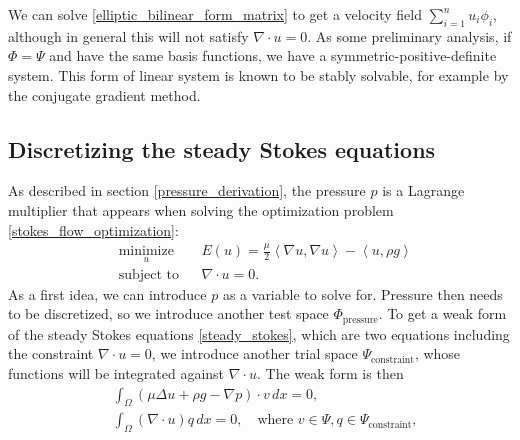 \documentclass[11pt,a4paper]{memoir}
\newcommand{\inner}[1]{\left<#1\right>}
\newcommand{\om}{{\Omega}}
\begin{document}
We can solve \eqref{elliptic_bilinear_form_matrix} to get a velocity field $\sum_{i=1}^n u_i\phi_i$, although in general this will not satisfy $\nabla\cdot u = 0$.
As some preliminary analysis, if $\Phi = \Psi$ and have the same basis functions, we have a symmetric-positive-definite system. This form of linear system is known to be stably solvable,
for example by the conjugate gradient method.

\subsection{Discretizing the steady Stokes equations}\label{discretizing_steady_stokes}
As described in section \ref{pressure_derivation}, the pressure $p$ is a Lagrange multiplier that appears
when solving the optimization problem \eqref{stokes_flow_optimization}:
\begin{equation*}
\begin{aligned}
& \underset{u}{\text{minimize}}
& & E(u) =  \frac{\mu}{2} \inner{\nabla u, \nabla u} - \inner{u, \rho g}\\
& \text{subject to}
& & \nabla\cdot u = 0.
\end{aligned}
\end{equation*}
\newcommand{\trialconstraint}{{\Psi_{\text{constraint}}}}
\newcommand{\testpressure}{{\Phi_{\text{pressure}}}}
As a first idea, we can introduce $p$ as a variable to solve for.
Pressure then needs to be discretized, so we introduce another test space $\testpressure$.
To get a weak form of the steady Stokes equations \eqref{steady_stokes}, which are two equations including the constraint $\nabla\cdot u = 0$, we introduce
another trial space $\trialconstraint$, whose functions will be integrated against $\nabla\cdot u$. The weak form is then
\begin{equation*}
\begin{split}
    &\int_\om \left(\mu\Delta u + \rho g - \nabla p\right)\cdot v\,dx = 0,\\
    &\int_\om \left(\nabla\cdot u\right) q\,dx = 0, \quad\text{where $v \in \Psi, q \in \trialconstraint$},
\end{split}
\end{equation*}
\end{document}
